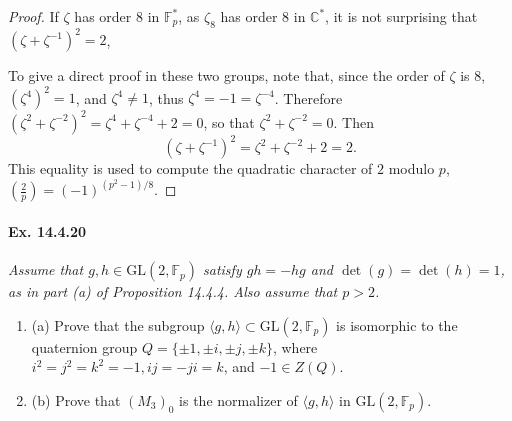 \documentclass[11pt,a4paper]{article}
\newcommand{\be} {\begin{enumerate}}
\newcommand{\ee} {\end{enumerate}}
\newcommand{\C}{\mathbb{C}}
\newcommand{\F}{\mathbb{F}}
\newcommand{\legendre}[2]{\genfrac{(}{)}{}{}{#1}{#2}}
\begin{document}
{\begin{proof}
If $\zeta$ has order $8$ in $\F_p^*$, as $\zeta_8$ has order $8$ in $\C^*$, it is not surprising that $(\zeta + \zeta^{-1})^2 = 2$,

To give a direct proof in these two groups, note that, since the order of $\zeta$ is $8$,  
$(\zeta^4)^2 = 1$, and $\zeta^4 \ne 1$, thus $\zeta^4 = -1 = \zeta^{-4}$. Therefore $(\zeta^2 + \zeta^{-2})^2 = \zeta^4 + \zeta^{-4} + 2 = 0$, so that $\zeta^2 + \zeta^{-2} = 0$. Then 
$$(\zeta + \zeta^{-1})^2 = \zeta^2 + \zeta^{-2} + 2 = 2.$$
This equality is used to compute the quadratic character of $2$ modulo $p$, $\legendre{2}{p} = (-1)^{(p^2-1)/8}$.
\end{proof}

\paragraph{Ex. 14.4.20}{\it Assume that $g,h \in \mathrm{GL}(2,\F_p)$ satisfy $gh = -hg$ and $\det(g) = \det(h) = 1$, as in part (a) of Proposition 14.4.4. Also assume that $p>2$.
\be
\item[(a)] Prove that the subgroup $\langle g,h\rangle \subset \mathrm{GL}(2,\F_p)$ is isomorphic to the quaternion group $Q = \{\pm 1, \pm i, \pm j, \pm k\}$, where $i^2 = j^2 = k^2 = -1, ij = -ji = k$, and $-1 \in Z(Q)$.
\item[(b)] Prove that $(M_3)_0$ is the normalizer of $\langle g,h \rangle$ in $\mathrm{GL}(2,\F_p)$.
\ee

}}
\end{document}

